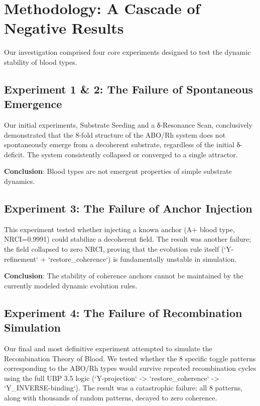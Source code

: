 \documentclass[11pt]{article}
\begin{document}
\section{Methodology: A Cascade of Negative Results}

Our investigation comprised four core experiments designed to test the dynamic stability of blood types.

\subsection{Experiment 1 & 2: The Failure of Spontaneous Emergence}

Our initial experiments, Substrate Seeding and a δ-Resonance Scan, conclusively demonstrated that the 8-fold structure of the ABO/Rh system does not spontaneously emerge from a decoherent substrate, regardless of the initial δ-deficit. The system consistently collapsed or converged to a single attractor.

\textbf{Conclusion}: Blood types are not emergent properties of simple substrate dynamics.

\subsection{Experiment 3: The Failure of Anchor Injection}

This experiment tested whether injecting a known anchor (A+ blood type, NRCI=0.9991) could stabilize a decoherent field. The result was another failure; the field collapsed to zero NRCI, proving that the evolution rule itself (`Y-refinement` + `restore_coherence`) is fundamentally unstable in simulation.

\textbf{Conclusion}: The stability of coherence anchors cannot be maintained by the currently modeled dynamic evolution rules.

\subsection{Experiment 4: The Failure of Recombination Simulation}

Our final and most definitive experiment attempted to simulate the Recombination Theory of Blood. We tested whether the 8 specific toggle patterns corresponding to the ABO/Rh types would survive repeated recombination cycles using the full UBP 3.5 logic (`Y-projection` -> `restore_coherence` -> `Y_INVERSE-binding`). The result was a catastrophic failure: all 8 patterns, along with thousands of random patterns, decayed to zero coherence.
\end{document}
